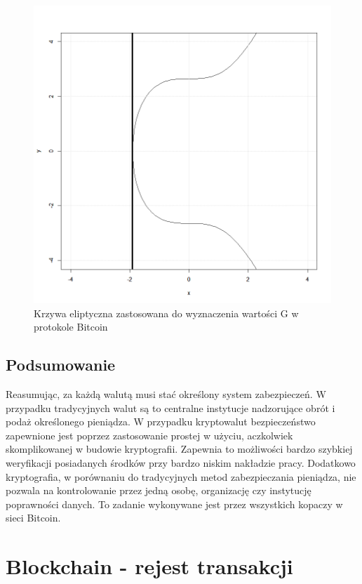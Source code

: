 \documentclass[12pt, twoside, final, openany]{mgr}
\begin{document}
\newpage
\vfill
\begin{figure}[!h]
\centering
\includegraphics[width=0.9\linewidth]{pictures/elliptic.png}
\caption{Krzywa eliptyczna zastosowana do wyznaczenia wartości G w protokole Bitcoin}
\label{fig:krzywaEliptyczna}
\end{figure}

\section{Podsumowanie} \label{sec:podsumowanieKryptowaluty}
\indent Reasumując, za każdą walutą musi stać określony system zabezpieczeń. W przypadku tradycyjnych walut są to centralne instytucje nadzorujące obrót i podaż określonego pieniądza. W przypadku kryptowalut bezpieczeństwo zapewnione jest poprzez zastosowanie prostej w użyciu, aczkolwiek skomplikowanej w budowie kryptografii. Zapewnia to możliwości bardzo szybkiej weryfikacji posiadanych środków przy bardzo niskim nakładzie pracy. Dodatkowo kryptografia, w porównaniu do tradycyjnych metod zabezpieczania pieniądza, nie pozwala na kontrolowanie przez jedną osobę, organizację czy instytucję poprawności danych. To zadanie wykonywane jest przez wszystkich kopaczy w sieci Bitcoin. 


\chapter{Blockchain - rejest transakcji}
\label{blockchain}
\end{document}
